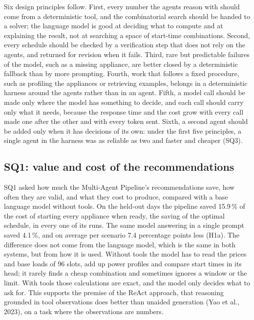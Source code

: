 \documentclass[12pt,a4paper]{report}
\begin{document}
Six design principles follow. First, every number the agents reason
with should come from a deterministic tool, and the combinatorial search
should be handed to a solver; the language model is good at deciding
what to compute and at explaining the result, not at searching a space
of start-time combinations. Second, every schedule should be checked by
a verification step that does not rely on the agents, and returned for
revision when it fails. Third, rare but predictable failures of the
model, such as a missing appliance, are better closed by a deterministic
fallback than by more prompting. Fourth, work that follows a fixed
procedure, such as profiling the appliances or retrieving examples,
belongs in a deterministic harness around the agents rather than in an
agent. Fifth, a model call should be made only where the model has
something to decide, and each call should carry only what it needs,
because the response time and the cost grow with every call made one
after the other and with every token sent. Sixth, a second agent should
be added only when it has decisions of its own: under the first five
principles, a single agent in the harness was as reliable as two and
faster and cheaper (SQ3).

\subsection{SQ1: value and cost of the recommendations}

SQ1 asked how much the Multi-Agent Pipeline's recommendations save, how
often they are valid, and what they cost to produce, compared with a base
language model without tools. On the held-out days the pipeline saved
15.9\,\% of the cost of starting every appliance when ready, the saving
of the optimal schedule, in every one of its runs. The same model
answering in a single prompt saved 4.1\,\%, and on average per scenario
7.4 percentage points less (H1a). The difference does not come from the
language model, which is the same in both systems, but from how it is
used. Without tools the model has to read the prices and base loads of
96 slots, add up power profiles and compare start times in its head; it
rarely finds a cheap combination and sometimes ignores a window or the
limit. With tools those calculations are exact, and the model only
decides what to ask for. This supports the premise of the ReAct
approach, that reasoning grounded in tool observations does better than
unaided generation (Yao et al., 2023), on a task where the observations
are numbers.
\end{document}
